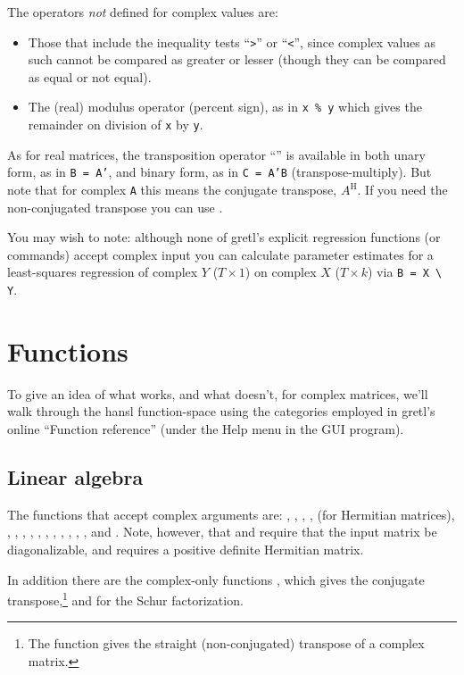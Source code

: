 The operators \textit{not} defined for complex values are:
\begin{itemize}
\item Those that include the inequality tests ``\verb+>+'' or
  ``\verb+<+'', since complex values as such cannot be compared as
  greater or lesser (though they can be compared as equal or not
  equal).
\item The (real) modulus operator (percent sign), as in \texttt{x \%
    y} which gives the remainder on division of \texttt{x} by
  \texttt{y}.
\end{itemize}

As for real matrices, the transposition operator ``'' is
available in both unary form, as in \texttt{B = A'}, and binary form,
as in \texttt{C = A'B} (transpose-multiply). But note that for complex
\texttt{A} this means the conjugate transpose, $A^\mathrm{H}$. If you
need the non-conjugated transpose you can use .

You may wish to note: although none of gretl's explicit regression
functions (or commands) accept complex input you can calculate
parameter estimates for a least-squares regression of complex $Y$
($T \times 1$) on complex $X$ ($T \times k$) via \verb|B = X \ Y|.

\section{Functions}
\label{sec:cmplx-funcs}

To give an idea of what works, and what doesn't, for complex
matrices, we'll walk through the hansl function-space using the
categories employed in gretl's online ``Function reference'' (under the
\textsf{Help} menu in the GUI program).

\subsection{Linear algebra}

The functions that accept complex arguments are: ,
, , ,  (for Hermitian
matrices), , , , , ,
, , , , ,
, and . Note, however, that  and
 require that the input matrix be diagonalizable, and
 requires a positive definite Hermitian matrix.

In addition there are the complex-only functions , which
gives the conjugate transpose,\footnote{The  function
  gives the straight (non-conjugated) transpose of a complex matrix.}
and  for the Schur factorization.

